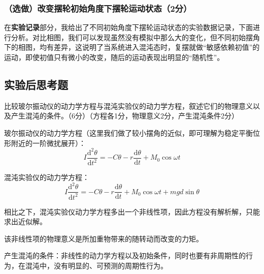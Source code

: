 \subsubsection{（选做）改变摆轮初始角度下摆轮运动状态（2分）}
在\textbf{实验记录}部分，我给出了不同初始角度下摆轮运动状态的实验数据记录，下面进行分析。对比相图，我们可以发现虽然没有模拟中那么大的变化，但不同初始摆角下的相图，均有差异，这说明了当系统进入混沌态时，复摆就做“敏感依赖初值”的运动，即使初值只有微小的改变，随后的运动表现出明显的“随机性”。


\clearpage
\subsection{实验后思考题}
\begin{question}
	比较玻尔振动仪的动力学方程与混沌实验仪的动力学方程，叙述它们的物理意义以及产生混沌的条件。（6分）（方程各1分，物理意义2分，产生混沌条件2分）
\end{question}
玻尔振动仪的动力学方程（这里我们做了较小摆角的近似，即可理解为稳定平衡位形附近的一阶微扰展开）：
\[I\frac{\mathrm{d}^2\theta }{\mathrm{d} t^2}=-C\theta-r\frac{\mathrm{d}\theta}{\mathrm{d} t}+M_0\cos\omega t\]

混沌实验仪的动力学方程：
\[I\frac{\mathrm{d}^2\theta }{\mathrm{d} t^2}=-C\theta-r\frac{\mathrm{d}\theta}{\mathrm{d} t}+M_0\cos\omega t+mgd\sin\theta\]

相比之下，混沌实验仪动力学方程多出一个非线性项，因此方程没有解析解，只能求出近似解。 

该非线性项的物理意义是所加重物带来的随转动而改变的力矩。 

产生混沌的条件：非线性的动力学方程以及初始条件，同时也要有非周期性的行为，在混沌中，没有明显的、可预测的周期性行为。

